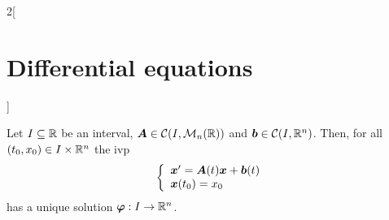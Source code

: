 \documentclass[../../../main.tex]{subfiles}
\begin{document}
\begin{multicols}{2}[\section{Differential equations}]
\begin{prop}
  \end{prop}
  \begin{corollary}
    Let $I\subseteq\mathbb{R}$ be an interval, $\boldsymbol{A}\in\mathcal{C}(I,\mathcal{M}_n(\mathbb{R}))$ and $\boldsymbol{b}\in\mathcal{C}(I,\mathbb{R}^n)$. Then, for all $(t_0,x_0)\in I\times\mathbb{R}^n$ the ivp
    $$
      \left\{
      \begin{array}{l}
        \boldsymbol{x}'=\boldsymbol{A}(t)\boldsymbol{x}+\boldsymbol{b}(t) \\
        \boldsymbol{x}(t_0)=x_0
      \end{array}
      \right.
    $$
    has a unique solution $\boldsymbol{\varphi}:I\rightarrow\mathbb{R}^n$.
  \end{corollary}
\end{multicols}
\end{document}

